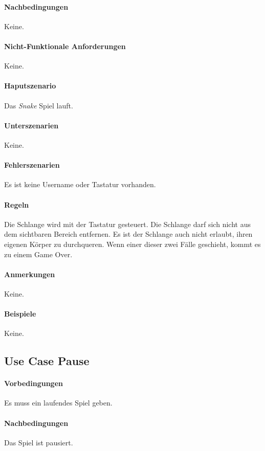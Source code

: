 \documentclass[a4paper, twosided, 11pt]{scrartcl}
\begin{document}
\paragraph{Nachbedingungen} Keine.
\paragraph{Nicht-Funktionale Anforderungen} Keine.
\paragraph{Haputszenario} Das \emph{Snake} Spiel lauft.
\paragraph{Unterszenarien} Keine.
\paragraph{Fehlerszenarien} Es ist keine Username oder Tastatur vorhanden.
\paragraph{Regeln}
Die Schlange wird mit der Tastatur gesteuert. Die Schlange darf sich nicht aus
dem sichtbaren Bereich entfernen. Es ist der Schlange auch nicht erlaubt, ihren
eigenen Körper zu durchqueren. Wenn einer dieser zwei F\"alle geschieht, kommt es zu einem Game
Over.

\paragraph{Anmerkungen} Keine.
\paragraph{Beispiele} Keine.

\subsection{Use Case Pause}
\paragraph{Vorbedingungen} Es muss ein laufendes Spiel geben.
\paragraph{Nachbedingungen} Das Spiel ist pausiert.
\end{document}
